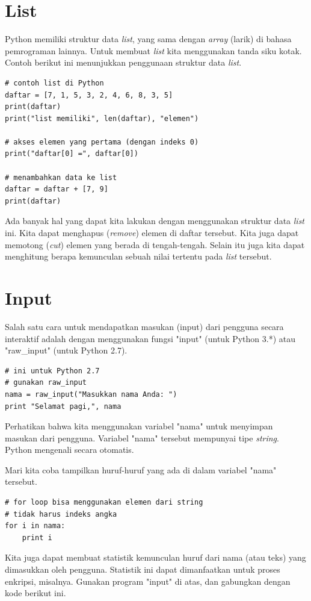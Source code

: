\section{List}
Python memiliki struktur data {\em list}, yang sama dengan {\em array}
(larik) di bahasa pemrograman lainnya. Untuk membuat {\em list} kita
menggunakan tanda siku kotak. Contoh berikut ini menunjukkan penggunaan 
struktur data {\em list}.

\begin{verbatim}
# contoh list di Python
daftar = [7, 1, 5, 3, 2, 4, 6, 8, 3, 5]
print(daftar)
print("list memiliki", len(daftar), "elemen")

# akses elemen yang pertama (dengan indeks 0)
print("daftar[0] =", daftar[0])

# menambahkan data ke list
daftar = daftar + [7, 9]
print(daftar)
\end{verbatim}

Ada banyak hal yang dapat kita lakukan dengan menggunakan struktur data
{\em list} ini. Kita dapat menghapus ({\em remove}) elemen di daftar tersebut.
Kita juga dapat memotong ({\em cut}) elemen yang berada di tengah-tengah.
Selain itu juga kita dapat menghitung berapa kemunculan sebuah nilai
tertentu pada {\em list} tersebut.

    
\section{Input}
Salah satu cara untuk mendapatkan masukan (input) dari pengguna secara
interaktif adalah dengan menggunakan fungsi "input" (untuk Python 3.*)
atau "raw\_input" (untuk Python 2.7).

\begin{verbatim}
# ini untuk Python 2.7
# gunakan raw_input
nama = raw_input("Masukkan nama Anda: ")
print "Selamat pagi,", nama
\end{verbatim}

Perhatikan bahwa kita menggunakan variabel "nama" untuk menyimpan masukan
dari pengguna. Variabel "nama" tersebut mempunyai tipe {\em string}.
Python mengenali secara otomatis.

Mari kita coba tampilkan huruf-huruf yang ada di dalam variabel "nama"
tersebut.

\begin{verbatim}
# for loop bisa menggunakan elemen dari string
# tidak harus indeks angka
for i in nama:
    print i
\end{verbatim}

Kita juga dapat membuat statistik kemunculan huruf dari nama (atau teks)
yang dimasukkan oleh pengguna. Statistik ini dapat dimanfaatkan untuk
proses enkripsi, misalnya. Gunakan program "input" di atas, dan gabungkan
dengan kode berikut ini.

